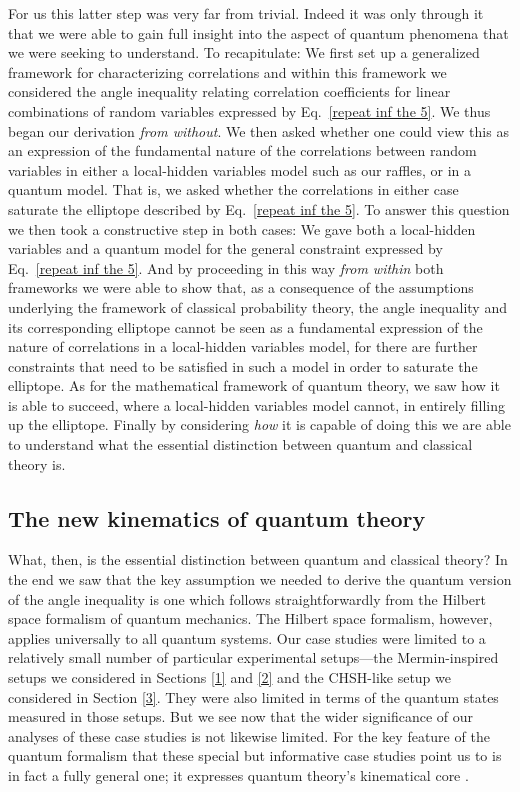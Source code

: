 For us this latter step was very far from trivial. Indeed it was only through it that we were able to gain full insight into the aspect of quantum phenomena that we were seeking to understand. To recapitulate: We first set up a generalized framework for characterizing correlations and within this framework we considered the angle inequality relating correlation coefficients for linear combinations of random variables expressed by Eq.\ \eqref{repeat inf the 5}. We thus began our derivation \emph{from without}. We then asked whether one could view this as an expression of the fundamental nature of the correlations between random variables in either a local-hidden variables model such as our raffles, or in a quantum model. That is, we asked whether the correlations in either case saturate the elliptope described by Eq.\ \eqref{repeat inf the 5}. To answer this question we then took a constructive step in both cases: We gave both a local-hidden variables and a quantum model for the general constraint expressed by Eq.\ \eqref{repeat inf the 5}. And by proceeding in this way \emph{from within} both frameworks we were able to show that, as a consequence of the assumptions underlying the framework of classical probability theory, the angle inequality and its corresponding elliptope cannot be seen as a fundamental expression of the nature of correlations in a local-hidden variables model, for there are further constraints that need to be satisfied in such a model in order to saturate the elliptope. As for the mathematical framework of quantum theory, we saw how it is able to succeed, where a local-hidden variables model cannot, in entirely filling up the elliptope. Finally by considering \emph{how} it is capable of doing this we are able to understand what the essential distinction between quantum and classical theory is.

\subsection{The new kinematics of quantum theory}
\label{4.3}

What, then, is the essential distinction between quantum and classical theory? In the end we saw that the key assumption we needed to derive the quantum version of the angle inequality is one which follows straightforwardly from the Hilbert space formalism of quantum mechanics. The Hilbert space formalism, however, applies universally to all quantum systems. Our case studies were limited to a relatively small number of particular experimental setups---the Mermin-inspired setups we considered in Sections \ref{1} and \ref{2} and the CHSH-like setup we considered in Section \ref{3}. They were also limited in terms of the quantum states measured in those setups. But we see now that the wider significance of our analyses of these case studies is not likewise limited. For the key feature of the quantum formalism that these special but informative case studies point us to is in fact a fully general one; it expresses quantum theory's kinematical core \citep[cf.][Section 1.2]{Janssen 2009}.

